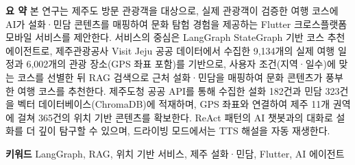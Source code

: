 \documentclass[10pt,twocolumn,a4paper]{article}
\begin{document}

{\small\noindent\textbf{요 약}\quad
본 연구는 제주도 방문 관광객을 대상으로, 실제 관광객이 검증한 여행 코스에
AI가 설화·민담 콘텐츠를 매핑하여 문화 탐험 경험을 제공하는 Flutter
크로스플랫폼 모바일 서비스를 제안한다. 서비스의 중심은 LangGraph StateGraph
기반 코스 추천 에이전트로, 제주관광공사 Visit Jeju 공공 데이터에서 수집한
9,134개의 실제 여행 일정과 6,002개의 관광 장소(GPS 좌표 포함)를 기반으로,
사용자 조건(지역·일수)에 맞는 코스를 선별한 뒤 RAG 검색으로 근처
설화·민담을 매핑하여 문화 콘텐츠가 풍부한 여행 코스를 추천한다.
제주도청 공공 API를 통해 수집한 설화 182건과 민담 323건을 벡터
데이터베이스(ChromaDB)에 적재하며, GPS 좌표와 연결하여 제주 11개 권역에
걸쳐 365건의 위치 기반 콘텐츠를 확보한다. ReAct 패턴의 AI 챗봇과의 대화로
설화를 더 깊이 탐구할 수 있으며, 드라이빙 모드에서는 TTS 해설을 자동
재생한다.}

\vspace{6pt}
{\small\noindent\textbf{키워드}\quad
LangGraph, RAG, 위치 기반 서비스, 제주 설화·민담, Flutter, AI 에이전트}

\vspace{8pt}

\end{document}

